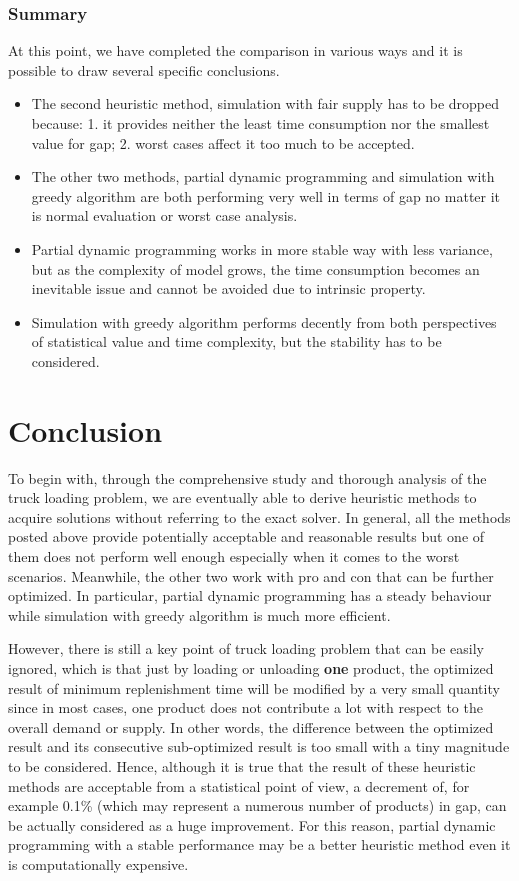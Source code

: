 \documentclass{article}
\begin{document}
\subsubsection{Summary}
At this point, we have completed the comparison in various ways and it is possible to draw several specific conclusions.

\begin{itemize}
\item The second heuristic method, simulation with fair supply has to be dropped because: 1. it provides neither the least time consumption nor the smallest value for gap; 2. worst cases affect it too much to be accepted.
\item The other two methods, partial dynamic programming and simulation with greedy algorithm are both performing very well in terms of gap no matter it is normal evaluation or worst case analysis.
\item Partial dynamic programming works in more stable way with less variance, but as the complexity of model grows, the time consumption becomes an inevitable issue and cannot be avoided due to intrinsic property.
\item Simulation with greedy algorithm performs decently from both perspectives of statistical value and time complexity, but the stability has to be considered.
\end{itemize}

\section{Conclusion }
To begin with, through the comprehensive study and thorough analysis of the truck loading problem, we are eventually able to derive heuristic methods to acquire solutions without referring to the exact solver. In general, all the methods posted above provide potentially acceptable and reasonable results but one of them does not perform well enough especially when it comes to the worst scenarios. Meanwhile, the other two work with pro and con that can be further optimized. In particular, partial dynamic programming has a steady behaviour while simulation with greedy algorithm is much more efficient. 

However, there is still a key point of truck loading problem that can be easily ignored, which is that just by loading or unloading \textbf{one} product, the optimized result of minimum replenishment time will be modified by a very small quantity since in most cases, one product does not contribute a lot with respect to the overall demand or supply. In other words, the difference between the optimized result and its consecutive sub-optimized result is too small with a tiny magnitude to be considered. Hence, although it is true that the result of these heuristic methods are acceptable from a statistical point of view, a decrement of, for example 0.1\% (which may represent a numerous number of products) in gap, can be actually considered as a huge improvement. For this reason, partial dynamic programming with a stable performance may be a better heuristic method even it is computationally expensive.
\end{document}
